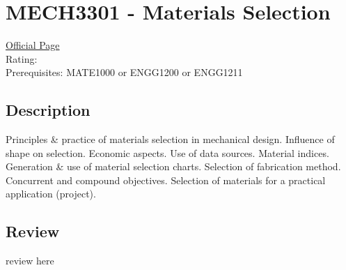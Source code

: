 \hypertarget{MECH3301}{\section{MECH3301 - Materials Selection}}

\large
\textcolor{turbo_purple}{\href{https://my.uq.edu.au/programs-courses/course.html?course_code=MECH3301}{Official Page}} \\
Rating: \cstar\cstar\cstar\cstar\ostar \\
Prerequisites: MATE1000 or ENGG1200 or ENGG1211

\normalsize
\subsection*{Description}
Principles \& practice of materials selection in mechanical design.
Influence of shape on selection.
Economic aspects.
Use of data sources.
Material indices.
Generation \& use of material selection charts. Selection of fabrication method.
Concurrent and compound objectives.
Selection of materials for a practical application (project).

\subsection*{Review}
review here
